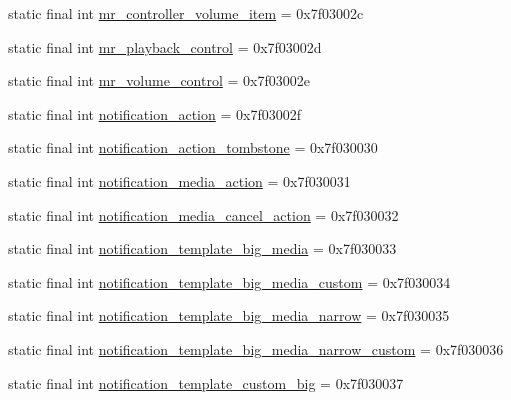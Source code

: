 \begin{CompactItemize}
\item 
static final int \hyperlink{classandroid_1_1support_1_1graphics_1_1drawable_1_1_r_1_1layout_d26934cfec8634043001f7cd0562ad6a}{mr\_\-controller\_\-volume\_\-item} = 0x7f03002c
\item 
static final int \hyperlink{classandroid_1_1support_1_1graphics_1_1drawable_1_1_r_1_1layout_bbbf387ec13814af0d36daa64dbe1f9d}{mr\_\-playback\_\-control} = 0x7f03002d
\item 
static final int \hyperlink{classandroid_1_1support_1_1graphics_1_1drawable_1_1_r_1_1layout_1bd6c95d3eff14692c346b0632c4cb30}{mr\_\-volume\_\-control} = 0x7f03002e
\item 
static final int \hyperlink{classandroid_1_1support_1_1graphics_1_1drawable_1_1_r_1_1layout_8bd2848e74c1e13dc4aafb54eb74890a}{notification\_\-action} = 0x7f03002f
\item 
static final int \hyperlink{classandroid_1_1support_1_1graphics_1_1drawable_1_1_r_1_1layout_dea4d87e4f540afbaf90acb0f1127763}{notification\_\-action\_\-tombstone} = 0x7f030030
\item 
static final int \hyperlink{classandroid_1_1support_1_1graphics_1_1drawable_1_1_r_1_1layout_b3fde8a604a882422862fe743cc7adf6}{notification\_\-media\_\-action} = 0x7f030031
\item 
static final int \hyperlink{classandroid_1_1support_1_1graphics_1_1drawable_1_1_r_1_1layout_b98abcf8f5999a7023c48e44a7fa379d}{notification\_\-media\_\-cancel\_\-action} = 0x7f030032
\item 
static final int \hyperlink{classandroid_1_1support_1_1graphics_1_1drawable_1_1_r_1_1layout_4cb9f07c180d8d456f658f7cb1c104c2}{notification\_\-template\_\-big\_\-media} = 0x7f030033
\item 
static final int \hyperlink{classandroid_1_1support_1_1graphics_1_1drawable_1_1_r_1_1layout_1c8f46baf9b127e5587ded22a3abf258}{notification\_\-template\_\-big\_\-media\_\-custom} = 0x7f030034
\item 
static final int \hyperlink{classandroid_1_1support_1_1graphics_1_1drawable_1_1_r_1_1layout_b2ee469149d129c9537d96b0a6475598}{notification\_\-template\_\-big\_\-media\_\-narrow} = 0x7f030035
\item 
static final int \hyperlink{classandroid_1_1support_1_1graphics_1_1drawable_1_1_r_1_1layout_79da09203e376e0ff69a45164ac1560b}{notification\_\-template\_\-big\_\-media\_\-narrow\_\-custom} = 0x7f030036
\item 
static final int \hyperlink{classandroid_1_1support_1_1graphics_1_1drawable_1_1_r_1_1layout_943c6bb2bbd0cc275012e35ffc686d0b}{notification\_\-template\_\-custom\_\-big} = 0x7f030037

\end{CompactItemize}
